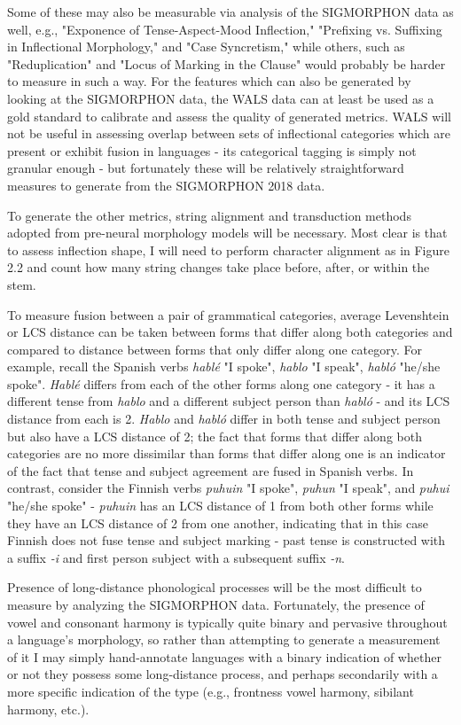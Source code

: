 Some of these may also be measurable via analysis of the SIGMORPHON data as well, e.g., "Exponence of Tense-Aspect-Mood Inflection," "Prefixing vs. Suffixing in Inflectional Morphology," and "Case Syncretism," while others, such as "Reduplication" and "Locus of Marking in the Clause" would probably be harder to measure in such a way. For the features which can also be generated by looking at the SIGMORPHON data, the WALS data can at least be used as a gold standard to calibrate and assess the quality of generated metrics. WALS will not be useful in assessing overlap between sets of inflectional categories which are present or exhibit fusion in languages - its categorical tagging is simply not granular enough - but fortunately these will be relatively straightforward measures to generate from the SIGMORPHON 2018 data.

To generate the other metrics, string alignment and transduction methods adopted from pre-neural morphology models will be necessary. Most clear is that to assess inflection shape, I will need to perform character alignment as in Figure 2.2 and count how many string changes take place before, after, or within the stem. 

To measure fusion between a pair of grammatical categories, average Levenshtein or LCS distance can be taken between forms that differ along both categories and compared to distance between forms that only differ along one category. For example, recall the Spanish verbs \textit{hablé} "I spoke", \textit{hablo} "I speak", \textit{habló} "he/she spoke". \textit{Hablé} differs from each of the other forms along one category - it has a different tense from \textit{hablo} and a different subject person than \textit{habló} - and its LCS distance from each is 2. \textit{Hablo} and \textit{habló} differ in both tense and subject person but also have a LCS distance of 2; the fact that forms that differ along both categories are no more dissimilar than forms that differ along one is an indicator of the fact that tense and subject agreement are fused in Spanish verbs. In contrast, consider the Finnish verbs \textit{puhuin} "I spoke", \textit{puhun} "I speak", and \textit{puhui} "he/she spoke" - \textit{puhuin} has an LCS distance of 1 from both other forms while they have an LCS distance of 2 from one another, indicating that in this case Finnish does not fuse tense and subject marking - past tense is constructed with a suffix \textit{-i} and first person subject with a subsequent suffix \textit{-n}.

Presence of long-distance phonological processes will be the most difficult to measure by analyzing the SIGMORPHON data. Fortunately, the presence of vowel and consonant harmony is typically quite binary and pervasive throughout a language's morphology, so rather than attempting to generate a measurement of it I may simply hand-annotate languages with a binary indication of whether or not they possess some long-distance process, and perhaps secondarily with a more specific indication of the type (e.g., frontness vowel harmony, sibilant harmony, etc.).

